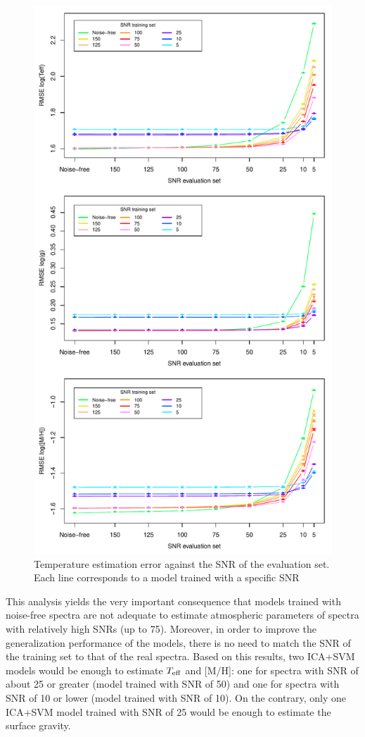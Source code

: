 \documentclass[a4paper,fleqn,usenatbib]{mnras}
\begin{document}
{{{\begin{figure}
\centering\includegraphics[width=\columnwidth]{snr_errors_log_global.pdf}
\caption{Temperature estimation error against the SNR of the evaluation set. Each line corresponds to a model trained with a specific SNR}
\label{fig:snrtrain}
\end{figure}

This analysis yields the very important consequence that models
trained with noise-free spectra are not adequate to estimate
atmospheric parameters of spectra with relatively high SNRs (up to
75). Moreover, in order to improve the generalization performance of
the models, there is no need to match the SNR of the training set to
that of the real spectra. Based on this results, two ICA+SVM models
would be enough to estimate $T_{\rm eff}$ and [M/H]: one for spectra 
with SNR of about 25 or greater (model trained with SNR of 50) and 
one for spectra with SNR of 10 or lower (model trained with SNR of 10).
On the contrary, only one ICA+SVM model trained with SNR of 25 would 
be enough to estimate the surface gravity.

}}}
\end{document}
